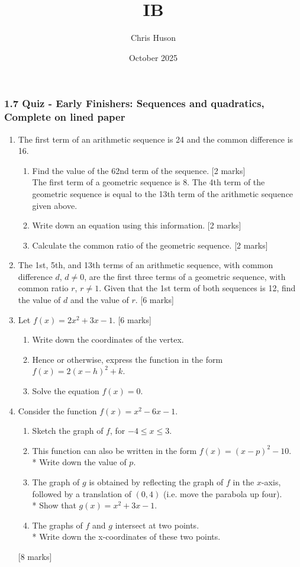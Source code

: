 \documentclass[12pt, twoside]{article}
\title{IB}
\author{Chris Huson}
\date{October 2025}
\begin{document}
\subsubsection*{1.7 Quiz - Early Finishers: Sequences and quadratics, Complete on lined paper}
\begin{enumerate}[itemsep=0.5cm]

\item The first term of an arithmetic sequence is 24 and the common difference is 16.
    \begin{enumerate}
        \item Find the value of the 62nd term of the sequence. \hfill [2 marks] \\[0.5cm]
        The first term of a geometric sequence is 8. The 4th term of the geometric sequence is equal to the 13th term of the arithmetic sequence given above. \vspace{0.25cm}
        \item Write down an equation using this information. \hfill [2 marks]
        \item Calculate the common ratio of the geometric sequence. \hfill [2 marks]
    \end{enumerate}

\item The 1st, 5th, and 13th terms of an arithmetic sequence, with common difference $d$, 
$d\ne 0$, are the first three terms of a geometric sequence, with common ratio $r$, $r \ne 1$. Given that the 1st term of both sequences is 12, find the value of $d$ and the value of $r$. \hfill [6 marks]


\item Let $f(x)=2x^2+3x-1$. \hfill [6 marks]
    \begin{enumerate}
        \item Write down the coordinates of the vertex.
        \item Hence or otherwise, express the function in the form $f(x)=2(x-h)^2 +k$.
        \item Solve the equation  $f(x)=0$.
    \end{enumerate}

\item Consider the function $f(x)=x^2-6x-1$.
    \begin{enumerate}
        \item Sketch the graph of $f$, for $-4 \leq x \leq 3$.
        \item This function can also be written in the form $f(x)=(x-p)^2 -10$.\\*
        Write down the value of $p$.
        \item The graph of $g$ is obtained by reflecting the graph of $f$ in the $x$-axis, followed by a translation of $(0, 4)$ (i.e. move the parabola up four).\\* Show that $g(x)=x^2+3x-1$.
        \item The graphs of $f$ and $g$ intersect at two points.\\*
        Write down the x-coordinates of these two points.
    \end{enumerate} \hfill [8 marks]

       
\end{enumerate}
\end{document}
